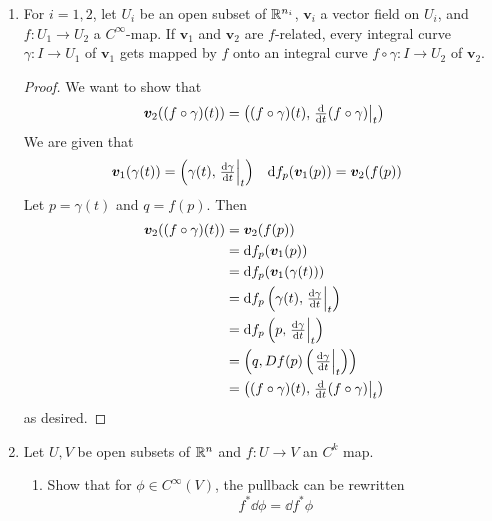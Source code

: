 \documentclass[../psets.tex]{subfiles}
\begin{document}
\begin{enumerate}[label={\textbf{2.2.\roman*.}}]
    \item For $i=1,2$, let $U_i$ be an open subset of $\mathbb{R}^{n_i}$, $\bm{v}_i$ a vector field on $U_i$, and $f:U_1\to U_2$ a $C^\infty$-map. If $\bm{v}_1$ and $\bm{v}_2$ are $f$-related, every integral curve $\gamma:I\to U_1$ of $\bm{v}_1$ gets mapped by $f$ onto an integral curve $f\circ\gamma:I\to U_2$ of $\bm{v}_2$.
    \begin{proof}
        We want to show that
        \begin{equation*}
            \bm{v}_2((f\circ\gamma)(t)) = \left( (f\circ\gamma)(t),\eval{\textstyle\dv{t}(f\circ\gamma)}_t \right)
        \end{equation*}
        We are given that
        \begin{align*}
            \bm{v}_1(\gamma(t)) &= \left( \gamma(t),\eval{\textstyle\dv{\gamma}{t}}_t \right)&
            \dd f_p(\bm{v}_1(p)) &= \bm{v}_2(f(p))
        \end{align*}
        Let $p=\gamma(t)$ and $q=f(p)$. Then
        \begin{align*}
            \bm{v}_2((f\circ\gamma)(t)) &= \bm{v}_2(f(p))\\
            &= \dd f_p(\bm{v}_1(p))\\
            &= \dd f_p(\bm{v}_1(\gamma(t)))\\
            &= \dd f_p\left( \gamma(t),\eval{\textstyle\dv{\gamma}{t}}_t \right)\\
            &= \dd f_p\left( p,\eval{\textstyle\dv{\gamma}{t}}_t \right)\\
            &= \left( q,Df(p)\left( \eval{\textstyle\dv{\gamma}{t}}_t \right) \right)\\
            &= \left( (f\circ\gamma)(t),\eval{\textstyle\dv{t}(f\circ\gamma)}_t \right)
        \end{align*}
        as desired.
    \end{proof}
    \item Let $U,V$ be open subsets of $\mathbb{R}^n$ and $f:U\to V$ an $C^k$ map.
    \begin{enumerate}
        \item Show that for $\phi\in C^\infty(V)$, the pullback can be rewritten
        \begin{equation*}
            f^*\dd{\phi} = \dd{f^*\phi}
        \end{equation*}

\end{enumerate}
\end{enumerate}
\end{document}
